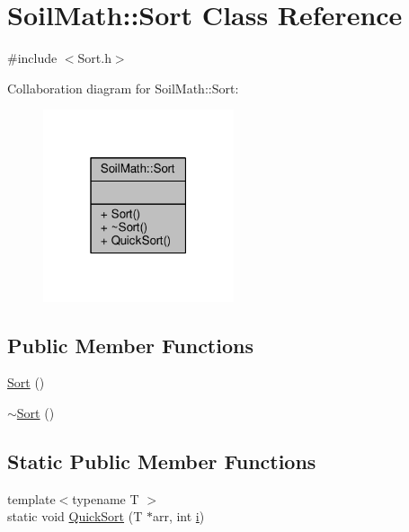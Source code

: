 \hypertarget{class_soil_math_1_1_sort}{}\section{Soil\+Math\+:\+:Sort Class Reference}
\label{class_soil_math_1_1_sort}


{\ttfamily \#include $<$Sort.\+h$>$}



Collaboration diagram for Soil\+Math\+:\+:Sort\+:\nopagebreak
\begin{figure}[H]
\begin{center}
\leavevmode
\includegraphics[width=159pt]{class_soil_math_1_1_sort__coll__graph}
\end{center}
\end{figure}
\subsection*{Public Member Functions}
\begin{DoxyCompactItemize}
\item 
\hyperlink{class_soil_math_1_1_sort_ac5553af8753454e71e6d621690fdab3f}{Sort} ()
\item 
\hyperlink{class_soil_math_1_1_sort_a62273dbd3620f999201abacdff5e2557}{$\sim$\+Sort} ()
\end{DoxyCompactItemize}
\subsection*{Static Public Member Functions}
\begin{DoxyCompactItemize}
\item 
{\footnotesize template$<$typename T $>$ }\\static void \hyperlink{class_soil_math_1_1_sort_adca7b48be7482f89767b806ad2016d67}{Quick\+Sort} (T $\ast$arr, int \hyperlink{_v_s_a___u_t_2_comparision_pictures_2_createtest_image_8m_a6f6ccfcf58b31cb6412107d9d5281426}{i})
\end{DoxyCompactItemize}



